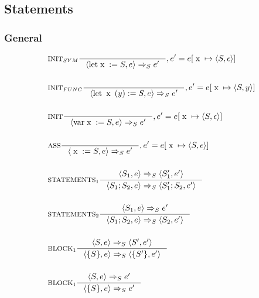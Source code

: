 \subsection{Statements}
\newcommand{\Tx}{\mathbin{\; \text{x} \;}}
\newcommand{\Tlet}{\text{let}}
\newcommand{\Tvar}{\text{var}}
\subsubsection{General}
\begin{align*}
&\inference[$\text{INIT}_{SYM}$]{}
                         {\Braket{\Tlet \Tx := S,e} \Rightarrow_S e'}
												 {, e' = e[\Tx \mapsto \Braket{S,\epsilon}]}
\\\\
&\inference[$\text{INIT}_{FUNC}$]{}
                         {\Braket{\Tlet \Tx(y) := S,e} \Rightarrow_S e'}
												 {, e' = e[\Tx \mapsto \Braket{S,y}]}
\\\\
&\inference[$\text{INIT}$]{}
                         {\Braket{\Tvar \Tx := S,e} \Rightarrow_S e'}
												 {, e' = e[\Tx \mapsto \Braket{S,\epsilon}]}
\\\\
&\inference[ASS]{}
                 {\Braket{\Tx := S,e} \Rightarrow_S e'}
								 {, e' = e[\Tx \mapsto \Braket{S,\epsilon}]}
\\\\
&\inference[$\text{STATEMENTS}_1$]{\Braket{S_1,e} \Rightarrow_S \Braket{S_1',e'}}
                         {\Braket{S_1;S_2,e} \Rightarrow_S \Braket{S_1';S_2,e'}}
\\\\
&\inference[$\text{STATEMENTS}_2$]{\Braket{S_1,e} \Rightarrow_S e'}
                         {\Braket{S_1;S_2,e} \Rightarrow_S \Braket{S_2,e'}}
\\\\
&\inference[$\text{BLOCK}_1$]{\Braket{S,e} \Rightarrow_S \Braket{S',e'}}
                         {\Braket{\{S\},e} \Rightarrow_S \Braket{\{S'\},e'}}
\\\\
&\inference[$\text{BLOCK}_1$]{\Braket{S,e} \Rightarrow_S e'}
                         {\Braket{\{S\},e} \Rightarrow_S e'}
\end{align*}


